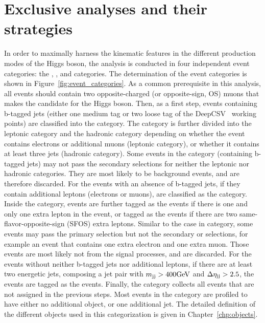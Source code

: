 \section{Exclusive analyses and their strategies}\label{sec:hmm_cat_and_strategy}
In order to maximally harness the kinematic features in the different production modes of the Higgs boson,
the analysis is conducted in four independent event categories: the \ggH, \qqH, \VH and \ttH categories.
The determination of the event categories is shown in Figure~\ref{fig:event_categories}.
As a common prerequisite in this analysis, all events should contain two opposite-charged (or opposite-sign, OS) muons that makes the candidate for the Higgs boson. 
Then, as a first step, events containing b-tagged jets (either one medium tag or two loose tag of the DeepCSV~\cite{Sirunyan:2017ezt} working points) are classified into the \ttH category.
The \ttH category is further divided into the \ttH leptonic category and the \ttH hadronic category depending on whether the event contains electrons or additional muons (leptonic category), 
or whether it contains at least three jets (hadronic category).
Some events in the \ttH category (containing b-tagged jets) may not pass the secondary selections for neither the leptonic nor hadronic categories.
They are most likely to be background events, and are therefore discarded.
For the events with an absence of b-tagged jets, if they contain additional leptons (electrons or muons), are classified as the \VH category.
Inside the \VH category, events are further tagged as the \WH events if there is one and only one extra lepton in the event, 
or tagged as the \ZH events if there are two same-flavor-opposite-sign (SFOS) extra leptons.
Similar to the case in \ttH category, some events may pass the primary \VH selection but not the secondary \WH or \ZH selections, 
for example an event that contains one extra electron and one extra muon.
Those events are most likely not from the signal processes, and are discarded.
For the events without neither b-tagged jets nor additional leptons, if there are at least two energetic jets, 
composing a jet pair with $m_{\mathrm{jj}}>400\mbox{GeV}$ and $\Delta\eta_{\mathrm{jj}}>2.5$, the events are tagged as the \qqH events.
Finally, the \ggH category collects all events that are not assigned in the previous steps. 
Most events in the \ggH category are profiled to have either no additional object, or one additional jet.
The detailed definition of the different objects used in this categorization is given in Chapter~\ref{chp:objects}.

